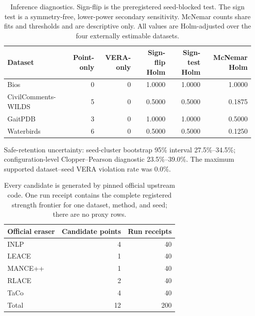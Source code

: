 \begin{table}[t]
\centering\scriptsize
\begin{tabular}{lrrrrr}
\toprule
Dataset & Point-only & VERA-only & Sign-flip Holm & Sign-test Holm & McNemar Holm \\
\midrule
Bios & 0 & 0 & 1.0000 & 1.0000 & 1.0000 \\
CivilComments-WILDS & 5 & 0 & 0.5000 & 0.5000 & 0.1875 \\
GaitPDB & 3 & 0 & 1.0000 & 1.0000 & 0.5000 \\
Waterbirds & 6 & 0 & 0.5000 & 0.5000 & 0.1250 \\
\bottomrule
\end{tabular}
\caption{Inference diagnostics. Sign-flip is the preregistered seed-blocked test. The sign test is a symmetry-free, lower-power secondary sensitivity. McNemar counts share fits and thresholds and are descriptive only. All values are Holm-adjusted over the four externally estimable datasets.}
\end{table}

Safe-retention uncertainty: seed-cluster bootstrap 95\% interval 27.5\%--34.5\%; configuration-level Clopper--Pearson diagnostic 23.5\%--39.0\%. The maximum supported dataset--seed VERA violation rate was 0.0\%.

\begin{table}[t]
\centering\small
\begin{tabular}{lrr}
\toprule
Official eraser & Candidate points & Run receipts \\
\midrule
INLP & 4 & 40 \\
LEACE & 1 & 40 \\
MANCE++ & 1 & 40 \\
RLACE & 2 & 40 \\
TaCo & 4 & 40 \\
\midrule
Total & 12 & 200 \\
\bottomrule
\end{tabular}
\caption{Every candidate is generated by pinned official upstream code. One run receipt contains the complete registered strength frontier for one dataset, method, and seed; there are no proxy rows.}
\end{table}
